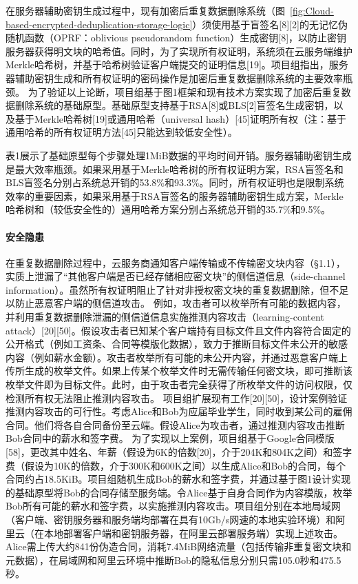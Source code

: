在服务器辅助密钥生成过程中，现有加密后重复数据删除系统（图~\ref{fig:Cloud-based-encrypted-deduplication-storage-logic}）须使用基于盲签名[8][2]的无记忆伪随机函数（OPRF：oblivious pseudorandom function）生成密钥[8]，以防止密钥服务器获得明文块的哈希值。同时，为了实现所有权证明，系统须在云服务端维护Merkle哈希树，并基于哈希树验证客户端提交的证明信息[19]。项目组指出，服务器辅助密钥生成和所有权证明的密码操作是加密后重复数据删除系统的主要效率瓶颈。
为了验证以上论断，项目组基于图1框架和现有技术方案实现了加密后重复数据删除系统的基础原型。基础原型支持基于RSA[8]或BLS[2]盲签名生成密钥，以及基于Merkle哈希树[19]或通用哈希（universal hash）[45]证明所有权（注：基于通用哈希的所有权证明方法[45]只能达到较低安全性）。

表1展示了基础原型每个步骤处理1MiB数据的平均时间开销。服务器辅助密钥生成是最大效率瓶颈。如果采用基于Merkle哈希树的所有权证明方案，RSA盲签名和BLS盲签名分别占系统总开销的53.8\%和93.3\%。同时，所有权证明也是限制系统效率的重要因素，如果采用基于RSA盲签名的服务器辅助密钥生成方案，Merkle哈希树和（较低安全性的）通用哈希方案分别占系统总开销的35.7\%和9.5\%。

\paragraph{安全隐患} 

在重复数据删除过程中，云服务商通知客户端传输或不传输密文块内容（§1.1），实质上泄漏了“其他客户端是否已经存储相应密文块”的侧信道信息（side-channel information）。虽然所有权证明阻止了针对非授权密文块的重复数据删除，但不足以防止恶意客户端的侧信道攻击。
例如，攻击者可以枚举所有可能的数据内容，并利用重复数据删除泄漏的侧信道信息实施推测内容攻击（learning-content attack）[20][50]。假设攻击者已知某个客户端持有目标文件且文件内容符合固定的公开格式（例如工资条、合同等模版化数据），致力于推断目标文件未公开的敏感内容（例如薪水金额）。攻击者枚举所有可能的未公开内容，并通过恶意客户端上传所生成的枚举文件。如果上传某个枚举文件时无需传输任何密文块，即可推断该枚举文件即为目标文件。此时，由于攻击者完全获得了所枚举文件的访问权限，仅检测所有权无法阻止推测内容攻击。
项目组扩展现有工作[20][50]，设计案例验证推测内容攻击的可行性。考虑Alice和Bob为应届毕业学生，同时收到某公司的雇佣合同。他们将各自合同备份至云端。假设Alice为攻击者，通过推测内容攻击推断Bob合同中的薪水和签字费。
为了实现以上案例，项目组基于Google合同模版[58]，更改其中姓名、年薪（假设为6K的倍数[20]，介于204K和804K之间）和签字费（假设为10K的倍数，介于300K和600K之间）以生成Alice和Bob的合同，每个合同约占18.5KiB。项目组随机生成Bob的薪水和签字费，并通过基于图1设计实现的基础原型将Bob的合同存储至服务端。令Alice基于自身合同作为内容模版，枚举Bob所有可能的薪水和签字费，以实施推测内容攻击。项目组分别在本地局域网（客户端、密钥服务器和服务端均部署在具有10Gb/s网速的本地实验环境）和阿里云（在本地部署客户端和密钥服务器，在阿里云部署服务端）实现上述攻击。Alice需上传大约841份伪造合同，消耗7.4MiB网络流量（包括传输非重复密文块和元数据），在局域网和阿里云环境中推断Bob的隐私信息分别只需105.0秒和475.5秒。
  

